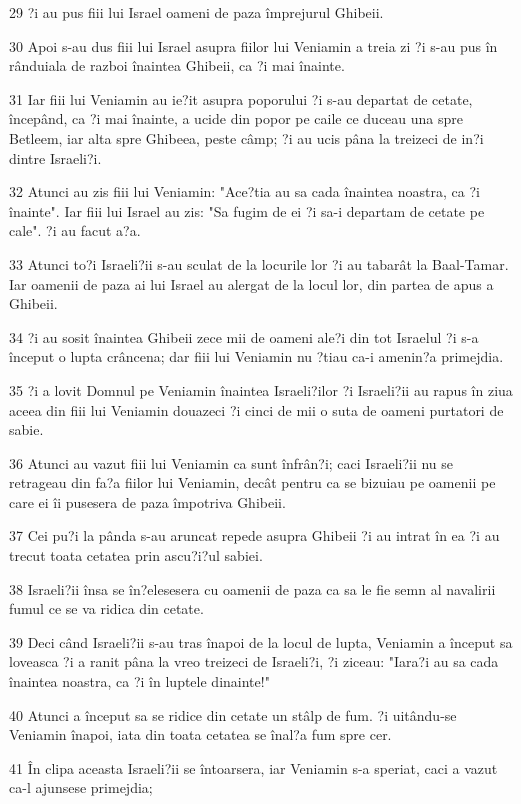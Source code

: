 \par 29 ?i au pus fiii lui Israel oameni de paza împrejurul Ghibeii.
\par 30 Apoi s-au dus fiii lui Israel asupra fiilor lui Veniamin a treia zi ?i s-au pus în rânduiala de razboi înaintea Ghibeii, ca ?i mai înainte.
\par 31 Iar fiii lui Veniamin au ie?it asupra poporului ?i s-au departat de cetate, începând, ca ?i mai înainte, a ucide din popor pe caile ce duceau una spre Betleem, iar alta spre Ghibeea, peste câmp; ?i au ucis pâna la treizeci de in?i dintre Israeli?i.
\par 32 Atunci au zis fiii lui Veniamin: "Ace?tia au sa cada înaintea noastra, ca ?i înainte". Iar fiii lui Israel au zis: "Sa fugim de ei ?i sa-i departam de cetate pe cale". ?i au facut a?a.
\par 33 Atunci to?i Israeli?ii s-au sculat de la locurile lor ?i au tabarât la Baal-Tamar. Iar oamenii de paza ai lui Israel au alergat de la locul lor, din partea de apus a Ghibeii.
\par 34 ?i au sosit înaintea Ghibeii zece mii de oameni ale?i din tot Israelul ?i s-a început o lupta crâncena; dar fiii lui Veniamin nu ?tiau ca-i amenin?a primejdia.
\par 35 ?i a lovit Domnul pe Veniamin înaintea Israeli?ilor ?i Israeli?ii au rapus în ziua aceea din fiii lui Veniamin douazeci ?i cinci de mii o suta de oameni purtatori de sabie.
\par 36 Atunci au vazut fiii lui Veniamin ca sunt înfrân?i; caci Israeli?ii nu se retrageau din fa?a fiilor lui Veniamin, decât pentru ca se bizuiau pe oamenii pe care ei îi pusesera de paza împotriva Ghibeii.
\par 37 Cei pu?i la pânda s-au aruncat repede asupra Ghibeii ?i au intrat în ea ?i au trecut toata cetatea prin ascu?i?ul sabiei.
\par 38 Israeli?ii însa se în?elesesera cu oamenii de paza ca sa le fie semn al navalirii fumul ce se va ridica din cetate.
\par 39 Deci când Israeli?ii s-au tras înapoi de la locul de lupta, Veniamin a început sa loveasca ?i a ranit pâna la vreo treizeci de Israeli?i, ?i ziceau: "Iara?i au sa cada înaintea noastra, ca ?i în luptele dinainte!"
\par 40 Atunci a început sa se ridice din cetate un stâlp de fum. ?i uitându-se Veniamin înapoi, iata din toata cetatea se înal?a fum spre cer.
\par 41 În clipa aceasta Israeli?ii se întoarsera, iar Veniamin s-a speriat, caci a vazut ca-l ajunsese primejdia;

